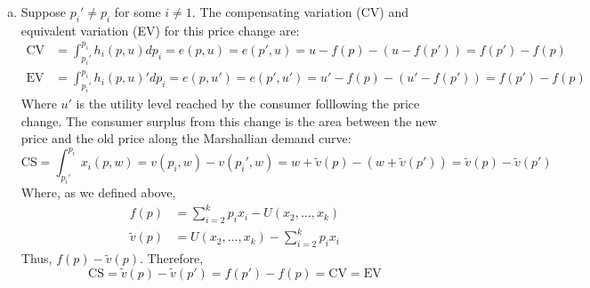 \documentclass{article}
\begin{document}
\begin{enumerate}[(a)]
	\item Suppose $p_i'\neq p_i$ for some $i\neq 1$. The compensating variation (CV) and equivalent variation (EV) for this price change are:
		\begin{align*}
			\text{CV} &= \int_{p_i'}^{p_i}h_i(p,u)dp_i = e(p,u) = e(p',u) = u - f(p) - (u-f(p')) = f(p')-f(p)	\\
			\text{EV} &= \int_{p_i'}^{p_i}h_i(p,u)'dp_i = e(p,u') = e(p',u') = u' - f(p) - (u'-f(p')) = f(p')-f(p)	
		\end{align*}
		Where $u'$ is the utility level reached by the consumer folllowing the price change. The consumer surplus from this change is the area between the new price and the old price along the Marshallian demand curve:
		\[
			\text{CS} = \int_{p_i'}^{p_i}x_i(p,w) = v(p_i,w) - v(p_i',w) = w + \tilde{v}(p) - (w + \tilde{v}(p')) = \tilde{v}(p) - \tilde{v}(p')
		\]
		Where, as we defined above,
		\begin{align*}
			f(p) &= \sum_{i=2}^kp_ix_i - U(x_2,...,x_k)	\\
			\tilde{v}(p) &= U(x_2,...,x_k) - \sum_{i=2}^kp_ix_i
		\end{align*}
		Thus, $f(p) -\tilde{v}(p)$. Therefore,
		\[
			\text{CS} = \tilde{v}(p) - \tilde{v}(p') = f(p') - f(p) = \text{CV} = \text{EV}
		\]
		
		
\end{enumerate}


\end{document}

